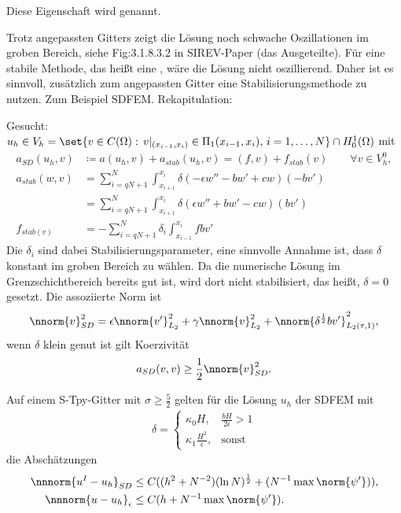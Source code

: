 \begin{bemerkung*}
  Diese Eigenschaft wird  genannt. 
\end{bemerkung*}
Trotz angepassten Gitters zeigt die Lösung noch schwache Oszillationen im groben Bereich, siehe Fig:3.1.8.3.2 in SIREV-Paper (das Ausgeteilte). Für eine stabile Methode, das heißt eine , wäre die Lösung nicht oszillierend. Daher ist es sinnvoll, zusätzlich zum angepassten Gitter eine Stabilisierungsmethode zu nutzen. Zum Beispiel SDFEM. Rekapitulation: 
\smallskip

Gesucht: $u_{h} \in V_{h}= \set{v \in C(\Omega): \, v|_{(x_{i-1}, x_{i})} \in \Pi_{1}(x_{i-1}, x_{i}), \, i = 1, \dots, N}\cap H_{0}^{1}(\Omega)$ mit
\begin{align*}
  a_{SD} (u_{h}, v) &\coloneqq a(u_{h}, v) +a_{stab}(u_{h}, v) = (f, v) + f_{stab}(v)  \qquad \forall v \in V_{h}^{0}, \\
  a_{stab}(w, v) &= \sum_{i = qN +1}^{N} \int_{x_{i+1}}^{x_{i}} \delta(- \epsilon w'' - b w' + cw)(-bv')\\
  &= \sum_{i = qN +1}^{N} \int_{x_{i+1}}^{x_{i}} \delta(\epsilon w'' + b w' - cw)(bv')\\
  f_{stab (v)} &= - \sum_{i = qN +1}^{N} \delta_{i} \int_{x_{i-1}}^{x_{i}} f b v'
\end{align*}
Die $\delta_{i}$ sind dabei Stabilisierungsparameter, eine sinnvolle Annahme ist, dass $\delta$ konstant im groben Bereich zu wählen. Da die numerische Lösung im Grenzschichtbereich bereits gut ist, wird dort nicht stabilisiert, das heißt, $\delta =0$ gesetzt. Die assoziierte Norm ist
\begin{align*}
  \nnorm {v}_{SD}^{2} = \epsilon   \nnorm {v'}_{L_{2}}^{2} + \gamma \nnorm {v}_{L_{2}}^{2}  + \nnorm { \delta^{\frac 12}bv'}_{L_{2}(\tau, 1)}^{2}, 
\end{align*}
wenn $\delta$ klein genut ist gilt Koerzivität
\begin{align*}
  a_{SD} (v, v) \geq \frac 12 \nnorm {v}_{SD}^{2}. 
\end{align*}
\begin{satz}\label{thm:6-21}
  Auf einem S-Tpy-Gitter mit $\sigma \geq \frac 52$ gelten für die Lösung $u_{h}$ der SDFEM mit
  \begin{align*}
    \delta =
    \begin{cases}
      \kappa_{0} H, & \frac{b H}{ 2 \epsilon}>1 \\
      \kappa_{1} \frac {H^{2}} \epsilon, & \text{sonst}
    \end{cases}
  \end{align*}
  die Abschätzungen
  \begin{align*}
    \nnnorm{u^{I} - u_{h}}_{SD} &\leq C ((h^{2} + N^{-2}) (\ln N)^{\frac 12} + (N^{-1} \max \norm{\psi'})), \\
    \nnnorm{u - u_{h}}_{\epsilon} &\leq C (h + N^{-1} \max\norm{\psi'}). 
  \end{align*}
\end{satz}
